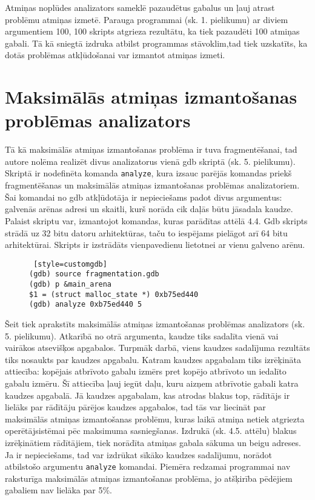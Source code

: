 Atmiņas noplūdes analizators sameklē pazaudētus gabalus un ļauj atrast problēmu atmiņas izmetē.
Parauga programmai (sk. 1. pielikumu) ar diviem argumentiem 100, 100 skripts atgrieza rezultātu, ka tiek pazaudēti 100 atmiņas gabali.
Tā kā sniegtā izdruka atbilst programmas stāvoklim,tad tiek uzskatīts, ka dotās problēmas atkļūdošanai var izmantot atmiņas izmeti.

\section{Maksimālās atmiņas izmantošanas problēmas analizators}
Tā kā maksimālās atmiņas izmantošanas problēma ir tuva fragmentēšanai, tad autore nolēma realizēt divus analizatorus vienā gdb skriptā (sk. 5. pielikumu).
Skriptā ir nodefinēta komanda \texttt{analyze}, kura izsauc parējās komandas priekš fragmentēšanas un maksimālās atmiņas izmantošanas problēmas analizatoriem.
Šai komandai no gdb atkļūdotāja ir nepieciešams padot divus argumentus: galvenās arēnas adresi un skaitli, kurš norāda cik daļās būtu jāsadala kaudze.
Palaist skriptu var, izmantojot komandas, kuras parādītas attēlā 4.4.
Gdb skripts strādā uz 32 bitu datoru arhitektūras, taču to iespējams pielāgot arī 64 bitu arhitektūrai.
Skripts ir izstrādāts vienpavedienu lietotnei ar vienu galveno arēnu.

\begin{figure}[h]
\begin{lstlisting} [style=customgdb]
(gdb) source fragmentation.gdb
(gdb) p &main_arena
$1 = (struct malloc_state *) 0xb75ed440
(gdb) analyze 0xb75ed440 5
\end{lstlisting}
\caption{\textbf{\fontsize{11}{12}\selectfont {Gdb skripta palaišana}}}
\end{figure} %


Šeit tiek aprakstīts maksimālās atmiņas izmantošanas problēmas analizators (sk. 5. pielikumu).
Atkarībā no otrā argumenta, kaudze tiks sadalīta vienā vai vairākos atsevišķos apgabalos.
Turpmāk darbā, viens kaudzes sadalījuma rezultāts tiks nosaukts par kaudzes apgabalu.
Katram kaudzes apgabalam tiks izrēķināta attiecība: kopējais atbrīvoto gabalu izmērs pret kopējo atbrīvoto un iedalīto gabalu izmēru.
Šī attiecība ļauj iegūt daļu, kuru aizņem atbrīvotie gabali katra kaudzes apgabalā.
Jā kaudzes apgabalam, kas atrodas blakus top, rādītājs ir lielāks par rādītāju pārējos kaudzes apgabalos, tad tās var liecināt par maksimālās atmiņas izmantošanas problēmu, kuras laikā atmiņa netiek atgriezta operētājsistēmai pēc maksimuma sasniegšanas.
Izdrukā (sk. 4.5. attēlu) blakus izrēķinātiem rādītājiem, tiek norādīta atmiņas gabala sākuma un beigu adreses.
Ja ir nepieciešams, tad var izdrūkat sīkāko kaudzes sadalījumu, norādot atbilstošo argumentu \texttt{analyze} komandai.
Piemēra redzamai programmai nav raksturīga maksimālās atmiņas izmantošanas problēma, jo atšķirība pēdējiem gabaliem nav lielāka par 5\%.


